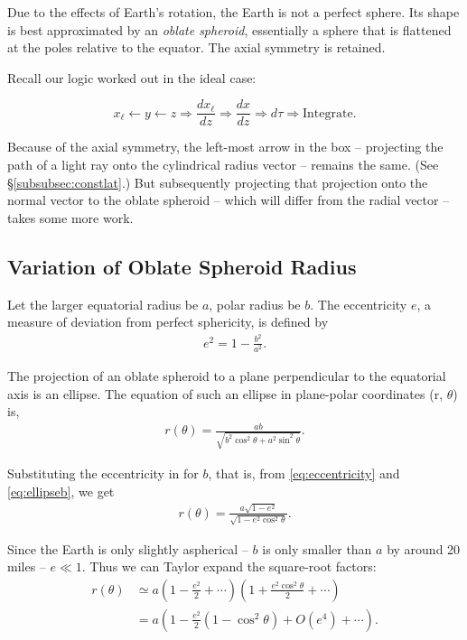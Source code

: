 \documentclass[10pt]{article}
\begin{document}

Due to the effects of Earth's rotation, the Earth is not a perfect sphere. Its shape is best approximated by an \emph{oblate spheroid}, essentially a sphere that is flattened at the poles relative to the equator. The axial symmetry is retained.

\vspace{10pt} Recall our logic worked out in the ideal case:

$$
\boxed{x_{\ell} \leftarrow y \leftarrow z} \Rightarrow \frac{dx_{\ell}}{dz} \Rightarrow \frac{dx}{dz} \Rightarrow d\tau \Rightarrow \text{Integrate.}
$$

Because of the axial symmetry, the left-most arrow in the box -- projecting the path of a light ray onto the cylindrical radius vector -- remains the same. (See \S \ref{subsubsec:constlat}.) But subsequently projecting that projection onto the normal vector to the oblate spheroid -- which will differ from the radial vector -- takes some more work.

\subsection{Variation of Oblate Spheroid Radius}
\label{subsec:varrad}

Let the larger equatorial radius be $a$, polar radius be $b$. The eccentricity $e$, a measure of deviation from perfect sphericity, is defined by
\begin{align} \label{eq:eccentricity}
e^2 = 1 - \frac{b^2}{a^2}.
\end{align}

The projection of an oblate spheroid to a plane perpendicular to the equatorial axis is an ellipse. The equation of such an ellipse in plane-polar coordinates (r, $\theta$) is,
\begin{align} \label{eq:ellipseb}
r(\theta) = \frac{ab}{\sqrt{b^2 \cos^2 \theta + a^2 \sin^2 \theta}}.
\end{align}

Substituting the eccentricity in for $b$, that is, from \ref{eq:eccentricity} and \ref{eq:ellipseb}, we get
\begin{align} \label{eq:ellipsee}
r(\theta) = \frac{a \sqrt{1-e^2}}{\sqrt{1 - e^2 \cos^2 \theta}}.
\end{align}

Since the Earth is only slightly aspherical -- $b$ is only smaller than $a$ by around 20 miles -- $e \ll 1$. Thus we can Taylor expand the square-root factors:
\begin{align*}
r(\theta) &\simeq a \left(1-\frac{e^2}{2} + \cdots \right) \left(1+\frac{e^2 \cos^2 \theta}{2} + \cdots \right) \\[0.5em]
&= a\left(1 - \frac{e^2}{2}(1 - \cos^2 \theta) + O(e^4) + \cdots \right).
\end{align*}
\end{document}
